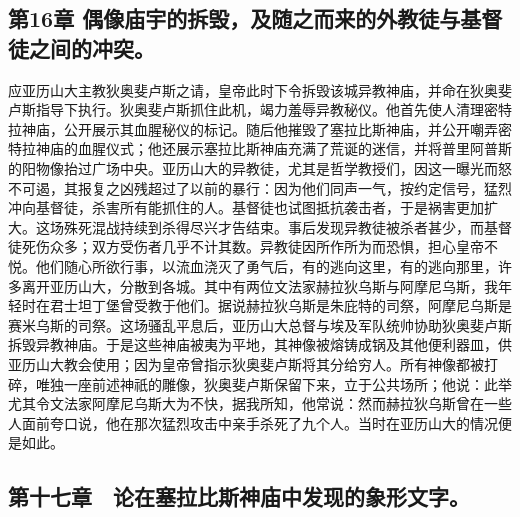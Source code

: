 
\subsection{第16章 偶像庙宇的拆毁，及随之而来的外教徒与基督徒之间的冲突。}

应亚历山大主教狄奥斐卢斯之请，皇帝此时下令拆毁该城异教神庙，并命在狄奥斐卢斯指导下执行。狄奥斐卢斯抓住此机，竭力羞辱异教秘仪。他首先使人清理密特拉神庙，公开展示其血腥秘仪的标记。随后他摧毁了塞拉比斯神庙，并公开嘲弄密特拉神庙的血腥仪式；他还展示塞拉比斯神庙充满了荒诞的迷信，并将普里阿普斯的阳物像抬过广场中央。亚历山大的异教徒，尤其是哲学教授们，因这一曝光而怒不可遏，其报复之凶残超过了以前的暴行：因为他们同声一气，按约定信号，猛烈冲向基督徒，杀害所有能抓住的人。基督徒也试图抵抗袭击者，于是祸害更加扩大。这场殊死混战持续到杀得尽兴才告结束。事后发现异教徒被杀者甚少，而基督徒死伤众多；双方受伤者几乎不计其数。异教徒因所作所为而恐惧，担心皇帝不悦。他们随心所欲行事，以流血浇灭了勇气后，有的逃向这里，有的逃向那里，许多离开亚历山大，分散到各城。其中有两位文法家赫拉狄乌斯与阿摩尼乌斯，我年轻时在君士坦丁堡曾受教于他们。据说赫拉狄乌斯是朱庇特的司祭，阿摩尼乌斯是赛米乌斯的司祭。这场骚乱平息后，亚历山大总督与埃及军队统帅协助狄奥斐卢斯拆毁异教神庙。于是这些神庙被夷为平地，其神像被熔铸成锅及其他便利器皿，供亚历山大教会使用；因为皇帝曾指示狄奥斐卢斯将其分给穷人。所有神像都被打碎，唯独一座前述神祇的雕像，狄奥斐卢斯保留下来，立于公共场所；他说：此举尤其令文法家阿摩尼乌斯大为不快，据我所知，他常说：然而赫拉狄乌斯曾在一些人面前夸口说，他在那次猛烈攻击中亲手杀死了九个人。当时在亚历山大的情况便是如此。\par


\subsection{第十七章　论在塞拉比斯神庙中发现的象形文字。}

